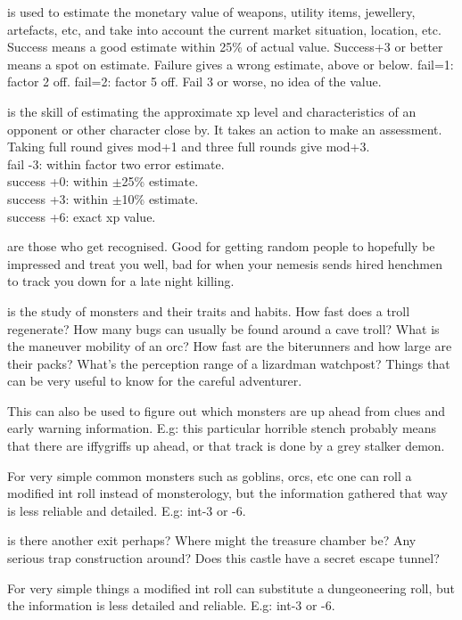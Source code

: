  is used to estimate the monetary value of weapons, utility items, jewellery, artefacts, etc, and take into account the current market situation, location, etc.
Success means a good estimate within 25\% of actual value. Success+3 or better means a spot on estimate. Failure gives a wrong estimate, above or below. fail=1: factor 2 off. fail=2: factor 5 off. Fail 3 or worse, no idea of the value.


 is the skill of estimating the approximate xp level and characteristics of an opponent or other character close by. It takes an action to make an assessment. Taking full round gives mod+1 and three full rounds give mod+3. \\
fail -3: within factor two error estimate. \\
success +0: within $\pm$25\% estimate. \\
success +3: within $\pm$10\% estimate. \\
success +6: exact xp value.


 are those who get recognised. Good for getting random people to hopefully be impressed and treat you well, bad for when your nemesis sends hired henchmen to track you down for a late night killing.


 is the study of monsters and their traits and habits. How fast does a troll regenerate? How many bugs can usually be found around a cave troll? What is the maneuver mobility of an orc? How fast are the biterunners and how large are their packs? What's the perception range of a lizardman watchpost? Things that can be very useful to know for the careful adventurer.

This can also be used to figure out which monsters are up ahead from clues and early warning information. E.g: this particular horrible stench probably means that there are iffygriffs up ahead, or that track is done by a grey stalker demon.

For very simple common monsters such as goblins, orcs, etc one can roll a modified int roll instead of monsterology, but the information gathered that way is less reliable and detailed. E.g: int-3 or -6.


 is there another exit perhaps? Where might the treasure chamber be? Any serious trap construction around? Does this castle have a secret escape tunnel?

For very simple things a modified int roll can substitute a dungeoneering roll, but the information is less detailed and reliable. E.g: int-3 or -6.


